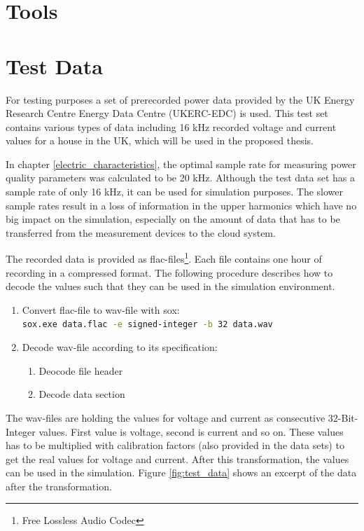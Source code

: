 \section{Tools}

\section{Test Data}
For testing purposes a set of prerecorded power data provided by the UK Energy Research Centre Energy Data Centre (UKERC-EDC) is used\cite{ukerc}.
This test set contains various types of data including 16 kHz recorded voltage and current values for a house in the UK, which will be used in the proposed thesis.

In chapter \ref{electric_characteristics}, the optimal sample rate for measuring power quality parameters was calculated to be 20 kHz. Although the test data set has a sample rate of only 16 kHz, it can be used for simulation purposes. The slower sample rates result in a loss of information in the upper harmonics which have no big impact on the simulation, especially on the amount of data that has to be transferred from the measurement devices to the cloud system.

The recorded data is provided as flac-files\footnote{Free Lossless Audio Codec\cite{flac}}. Each file contains one hour of recording in a compressed format. The following procedure describes how to decode the values such that they can be used in the simulation environment.

\begin{enumerate}
	\item Convert flac-file to wav-file with sox\cite{sox}: \\ \lstinline[language=bash,basicstyle=\ttfamily]{sox.exe data.flac -e signed-integer -b 32 data.wav}
	\item Decode wav-file according to its specification\cite{wav}:
	\begin{enumerate}
		\item Deocode file header
		\item Decode data section
	\end{enumerate}
\end{enumerate}

The wav-files are holding the values for voltage and current as consecutive 32-Bit-Integer values. First value is voltage, second is current and so on. These values has to be multiplied with calibration factors (also provided in the data sets) to get the real values for voltage and current. After this transformation, the values can be used in the simulation. Figure \ref{fig:test_data} shows an excerpt of the data after the transformation.


